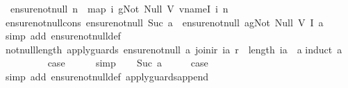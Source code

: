 \begin{isabellebody}
\ \ {\isachardoublequoteopen}ensure{\isacharunderscore}not{\isacharunderscore}null\ n\ {\isacharequal}\ map\ {\isacharparenleft}{\isasymlambda}i{\isachardot}\ gNot\ {\isacharparenleft}Null\ {\isacharparenleft}V\ {\isacharparenleft}vname{\isachardot}I\ i{\isacharparenright}{\isacharparenright}{\isacharparenright}{\isacharparenright}\ {\isacharbrackleft}{}{\isachardot}{\isachardot}{\isacharless}n{\isacharbrackright}{\isachardoublequoteclose}\isanewline
\isanewline
{}\isamarkupfalse%
\ ensure{\isacharunderscore}not{\isacharunderscore}null{\isacharunderscore}cons{\isacharcolon}\ {\isachardoublequoteopen}ensure{\isacharunderscore}not{\isacharunderscore}null\ {\isacharparenleft}Suc\ a{\isacharparenright}\ {\isacharequal}\ {\isacharparenleft}ensure{\isacharunderscore}not{\isacharunderscore}null\ a{\isacharparenright}{\isacharat}{\isacharbrackleft}gNot\ {\isacharparenleft}Null\ {\isacharparenleft}V\ {\isacharparenleft}I\ a{\isacharparenright}{\isacharparenright}{\isacharparenright}{\isacharbrackright}{\isachardoublequoteclose}\isanewline
%
\isadelimproof
\ \ %
\endisadelimproof
%
\isatagproof
{}\isamarkupfalse%
\ {\isacharparenleft}simp\ add{\isacharcolon}\ ensure{\isacharunderscore}not{\isacharunderscore}null{\isacharunderscore}def{\isacharparenright}%
\endisatagproof
{\isafoldproof}%
%
\isadelimproof
\isanewline
%
\endisadelimproof
\isanewline
{}\isamarkupfalse%
\ not{\isacharunderscore}null{\isacharunderscore}length{\isacharcolon}\ {\isachardoublequoteopen}apply{\isacharunderscore}guards\ {\isacharparenleft}ensure{\isacharunderscore}not{\isacharunderscore}null\ a{\isacharparenright}\ {\isacharparenleft}join{\isacharunderscore}ir\ ia\ r{\isacharparenright}\ {\isasymLongrightarrow}\ length\ ia\ {\isasymge}\ a{\isachardoublequoteclose}\isanewline
%
\isadelimproof
%
\endisadelimproof
%
\isatagproof
{}\isamarkupfalse%
{\isacharparenleft}induct\ a{\isacharparenright}\isanewline
\ \ \isamarkupfalse%
\ {}\isanewline
\ \ \isamarkupfalse%
\ \isamarkupfalse%
\ {\isacharquery}case\isanewline
\ \ \ \ \isamarkupfalse%
\ simp\isanewline
{}\isamarkupfalse%
\isanewline
\ \ \isamarkupfalse%
\ {\isacharparenleft}Suc\ a{\isacharparenright}\isanewline
\ \ \isamarkupfalse%
\ \isamarkupfalse%
\ {\isacharquery}case\isanewline
\ \ \ \ \isamarkupfalse%
\ {\isacharparenleft}simp\ add{\isacharcolon}\ ensure{\isacharunderscore}not{\isacharunderscore}null{\isacharunderscore}def\ apply{\isacharunderscore}guards{\isacharunderscore}append{\isacharparenright}\isanewline

\end{isabellebody}
